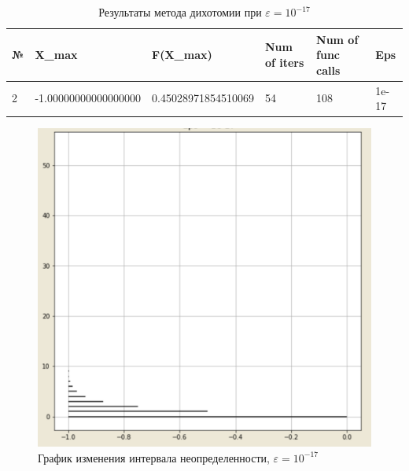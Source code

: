 \documentclass[10pt]{article}
\begin{document}
\begin{enumerate}
\begin{table}[H]
\caption{Результаты метода дихотомии при $\varepsilon = 10^{-17}$}
\begin{center}
\begin{tabular}{|l|l|l|l|l|l|}
\hline
№ & X\_max    & F(X\_max) & Num of iters & Num of func calls & Eps  \\
\hline
    2 & -1.00000000000000000        &    0.45028971854510069  &              54 &                  108 &
1e-17 \\
\hline
\end{tabular}
\end{center}
\end{table}

\begin{figure}[H]
\centering
\includegraphics[width=0.8\linewidth]{3.png}
\caption{График изменения интервала неопределенности, $\varepsilon = 10^{-17}$}
\label{fig:image1}
\end{figure}
\newpage



\end{enumerate}
\end{document}

